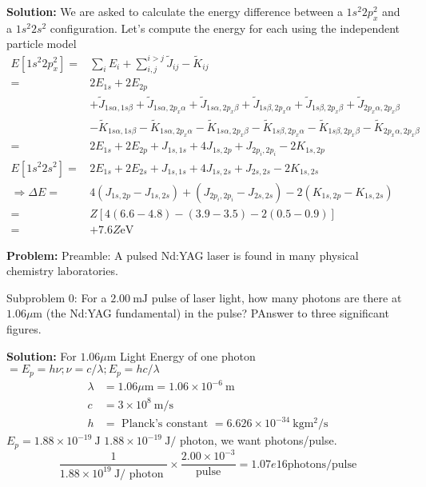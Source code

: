 \documentclass[10pt]{article}
\begin{document}
\textbf{Solution:}
We are asked to calculate the energy difference between a $1 s^{2} 2 p_{x}^{2}$ and a $1 s^{2} 2 s^{2}$ configuration. Let's compute the energy for each using the independent particle model
\[
\begin{aligned}
E\left[1 s^{2} 2 p_{x}^{2}\right]=& \sum_{i} E_{i}+\sum_{i, j}^{i>j} \widetilde{J}_{i j}-\widetilde{K}_{i j} \\
=& 2 E_{1 s}+2 E_{2 p} \\
&+\widetilde{J}_{1 s \alpha, 1 s \beta}+\widetilde{J}_{1 s \alpha, 2 p_{x} \alpha}+\widetilde{J}_{1 s \alpha, 2 p_{x} \beta}+\widetilde{J}_{1 s \beta, 2 p_{x} \alpha}+\widetilde{J}_{1 s \beta, 2 p_{x} \beta}+\widetilde{J}_{2 p_{x} \alpha, 2 p_{x} \beta} \\
&-\widetilde{K}_{1 s \alpha, 1 s \beta}-\widetilde{K}_{1 s \alpha, 2 p_{x} \alpha}-\widetilde{K}_{1 s \alpha, 2 p_{x} \beta}-\widetilde{K}_{1 s \beta, 2 p_{x} \alpha}-\widetilde{K}_{1 s \beta, 2 p_{x} \beta}-\widetilde{K}_{2 p_{x} \alpha, 2 p_{x} \beta} \\
=& 2 E_{1 s}+2 E_{2 p}+J_{1 s, 1 s}+4 J_{1 s, 2 p}+J_{2 p_{i}, 2 p_{i}}-2 K_{1 s, 2 p} \\
E\left[1 s^{2} 2 s^{2}\right]=& 2 E_{1 s}+2 E_{2 s}+J_{1 s, 1 s}+4 J_{1 s, 2 s}+J_{2 s, 2 s}-2 K_{1 s, 2 s} \\
\Rightarrow \Delta E=& 4\left(J_{1 s, 2 p}-J_{1 s, 2 s}\right)+\left(J_{2 p_{i}, 2 p_{i}}-J_{2 s, 2 s}\right)-2\left(K_{1 s, 2 p}-K_{1 s, 2 s}\right) \\
=& Z[4(6.6-4.8)-(3.9-3.5)-2(0.5-0.9)] \\
=&+\boxed{7.6 Z} \mathrm{eV}
\end{aligned}
\]


\textbf{Problem:}
Preamble: A pulsed Nd:YAG laser is found in many physical chemistry laboratories.

Subproblem 0: For a $2.00 \mathrm{~mJ}$ pulse of laser light, how many photons are there at $1.06 \mu \mathrm{m}$ (the Nd:YAG fundamental) in the pulse?  PAnswer to three significant figures.


\textbf{Solution:}
For $1.06 \mu \mathrm{m}$ Light
Energy of one photon $=E_{p}=h \nu ; \nu=c / \lambda ; E_{p}=h c / \lambda$
\[
\begin{aligned}
\lambda &=1.06 \mu \mathrm{m}=1.06 \times 10^{-6} \mathrm{~m} \\
c &=3 \times 10^{8} \mathrm{~m} / \mathrm{s} \\
h &=\text { Planck's constant }=6.626 \times 10^{-34} \mathrm{~kg} \mathrm{} \mathrm{m}^{2} / \mathrm{s}
\end{aligned}
\]
$E_{p}=1.88 \times 10^{-19} \mathrm{~J}$
$1.88 \times 10^{-19} \mathrm{~J} /$ photon, we want photons/pulse.
\[
\frac{1}{1.88 \times 10^{19} \mathrm{~J} / \text { photon }} \times \frac{2.00 \times 10^{-3}}{\text { pulse }}=\boxed{1.07e16} \mathrm{photons} / \mathrm{pulse}
\]
\end{document}

